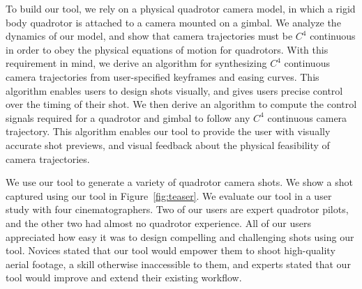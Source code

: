 To build our tool, we rely on a physical quadrotor camera model, in which a rigid body quadrotor is attached to a camera mounted on a gimbal.
We analyze the dynamics of our model, and show that camera trajectories must be $C^4$ continuous in order to obey the physical equations of motion for quadrotors.
With this requirement in mind, we derive an algorithm for synthesizing $C^4$ continuous camera trajectories from user-specified keyframes and easing curves.
This algorithm enables users to design shots visually, and gives users precise control over the timing of their shot.
We then derive an algorithm to compute the control signals required for a quadrotor and gimbal to follow any $C^4$ continuous camera trajectory.
This algorithm enables our tool to provide the user with visually accurate shot previews, and visual feedback about the physical feasibility of camera trajectories.


We use our tool to generate a variety of quadrotor camera shots. We show a shot captured using our tool in Figure~\ref{fig:teaser}.
We evaluate our tool in a user study with four cinematographers.
Two of our users are expert quadrotor pilots, and the other two had almost no quadrotor experience. All of our users appreciated how easy it was to design compelling and challenging shots using our tool.
Novices stated that our tool would empower them to shoot high-quality aerial footage, a skill otherwise inaccessible to them, and experts stated that our tool would improve and extend their existing workflow.
